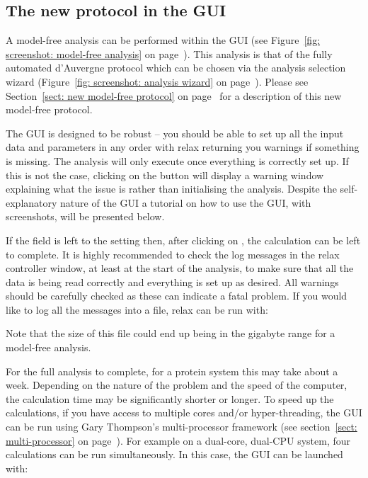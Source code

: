 \begin{htmlonly}
\begin{htmlonly}

\newpage
\section{The new protocol in the GUI}

A model-free analysis can be performed within the GUI (see Figure~\ref{fig: screenshot: model-free analysis} on page~\pageref{fig: screenshot: model-free analysis}).
This analysis is that of the fully automated d'Auvergne protocol which can be chosen via the analysis selection wizard (Figure~\ref{fig: screenshot: analysis wizard} on page~\pageref{fig: screenshot: analysis wizard}).
Please see Section~\ref{sect: new model-free protocol} on page~\pageref{sect: new model-free protocol} for a description of this new model-free protocol.

The GUI is designed to be robust -- you should be able to set up all the input data and parameters in any order with relax returning you warnings if something is missing.
The analysis will only execute once everything is correctly set up.
If this is not the case, clicking on the  button will display a warning window explaining what the issue is rather than initialising the analysis.
Despite the self-explanatory nature of the GUI a tutorial on how to use the GUI, with screenshots, will be presented below.

If the  field is left to the  setting then, after clicking on , the calculation can be left to complete.
It is highly recommended to check the log messages in the relax controller window, at least at the start of the analysis, to make sure that all the data is being read correctly and everything is set up as desired.
All warnings should be carefully checked as these can indicate a fatal problem.
If you would like to log all the messages into a file, relax can be run with:


Note that the size of this  file could end up being in the gigabyte range for a model-free analysis.

For the full analysis to complete, for a protein system this may take about a week.
Depending on the nature of the problem and the speed of the computer, the calculation time may be significantly shorter or longer.
To speed up the calculations, if you have access to multiple cores and/or hyper-threading, the GUI can be run using Gary Thompson's multi-processor framework (see section~\ref{sect: multi-processor} on page~\pageref{sect: multi-processor}).
For example on a dual-core, dual-CPU system, four calculations can be run simultaneously.
In this case, the GUI can be launched with:


\end{htmlonly}
\end{htmlonly}
